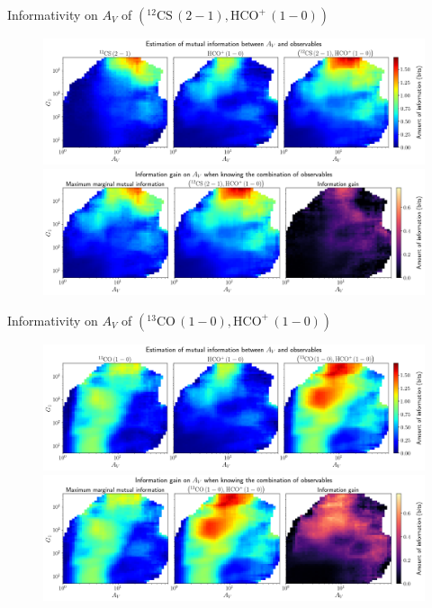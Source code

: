 \documentclass{beamer}
\begin{document}
\begin{frame}{Informativity on $A_V$ of $\left(\mathrm{^{12}CS\,(2-1)},\mathrm{HCO^+\,(1-0)}\right)$}
    \begin{figure}
        \centering
        \includegraphics[width=0.95\linewidth]{../mi/av__12cs21_hcop10_mi.png}
        \vfill
        \includegraphics[width=0.95\linewidth]{../mi/av__12cs21_hcop10_mi_gain.png}
    \end{figure}
\end{frame}

\begin{frame}{Informativity on $A_V$ of $\left(\mathrm{^{13}CO\,(1-0)},\mathrm{HCO^+\,(1-0)}\right)$}
    \begin{figure}
        \centering
        \includegraphics[width=0.95\linewidth]{../mi/av__13co10_hcop10_mi.png}
        \vfill
        \includegraphics[width=0.95\linewidth]{../mi/av__13co10_hcop10_mi_gain.png}
    \end{figure}
\end{frame}
\end{document}
